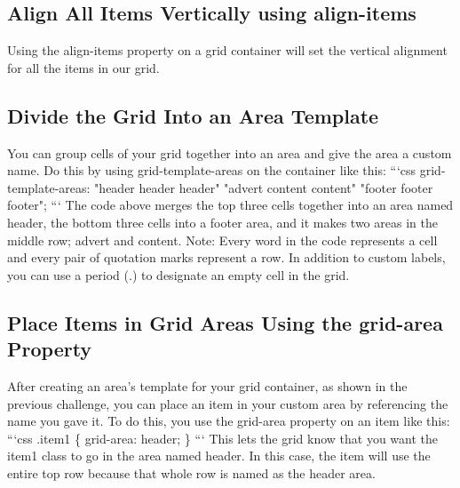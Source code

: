 \documentclass{article}%
\begin{document}
%
\subsection{Align All Items Vertically using align{-}items}%
\label{subsec:AlignAllItemsVerticallyusingalign{-}items}%
Using the align{-}items property on a grid container will set the vertical alignment for all the items in our grid.\newline%

%
\subsection{Divide the Grid Into an Area Template}%
\label{subsec:DividetheGridIntoanAreaTemplate}%
You can group cells of your grid together into an area and give the area a custom name. Do this by using grid{-}template{-}areas on the container like this:\newline%
```css\newline%
grid{-}template{-}areas:\newline%
  "header header header"\newline%
  "advert content content"\newline%
  "footer footer footer";\newline%
```\newline%
The code above merges the top three cells together into an area named header, the bottom three cells into a footer area, and it makes two areas in the middle row; advert and content.\newline%
Note: Every word in the code represents a cell and every pair of quotation marks represent a row.\newline%
In addition to custom labels, you can use a period (.) to designate an empty cell in the grid.\newline%

%
\subsection{Place Items in Grid Areas Using the grid{-}area Property}%
\label{subsec:PlaceItemsinGridAreasUsingthegrid{-}areaProperty}%
After creating an area's template for your grid container, as shown in the previous challenge, you can place an item in your custom area by referencing the name you gave it. To do this, you use the grid{-}area property on an item like this:\newline%
```css\newline%
.item1 \{\newline%
  grid{-}area: header;\newline%
\}\newline%
```\newline%
This lets the grid know that you want the item1 class to go in the area named header. In this case, the item will use the entire top row because that whole row is named as the header area.\newline%
\end{document}
